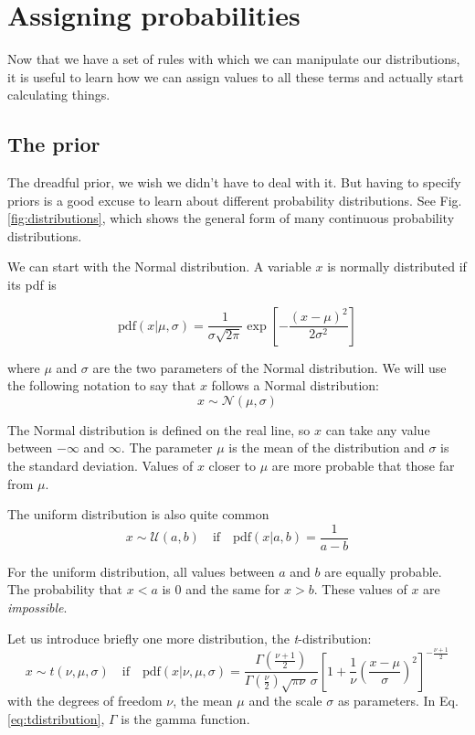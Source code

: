 \documentclass[a4paper,11pt]{article}
\begin{document}
\section{Assigning probabilities}

Now that we have a set of rules with which we can manipulate our distributions, it is useful to learn how we can assign values to all these terms and actually start calculating things.

\subsection{The prior}\label{sec:prior}

The dreadful prior, we wish we didn't have to deal with it. 
But having to specify priors is a good excuse to learn about different probability distributions. 
See Fig. \ref{fig:distributions}, which shows the general form of many continuous probability distributions.

We can start with the Normal distribution.
A variable $x$ is normally distributed if its pdf is

\begin{equation}
  \text{pdf}(x|\mu, \sigma) = \frac{1}{\sigma \sqrt{2\pi}} 
                              \exp\left[-\frac{(x-\mu)^2}{2\sigma^2}\right]
\end{equation}

where $\mu$ and $\sigma$ are the two parameters of the Normal distribution.
We will use the following notation to say that $x$ follows a Normal distribution:
%
\[x \sim \mathcal{N}(\mu, \sigma)\]
%

The Normal distribution is defined on the real line, so $x$ can take any value between $-\infty$ and $\infty$.
The parameter $\mu$ is the mean of the distribution and $\sigma$ is the standard deviation.
Values of $x$ closer to $\mu$ are more probable that those far from $\mu$.


The uniform distribution is also quite common
%
\[x \sim \mathcal{U}(a, b) \quad \text{if} \quad \text{pdf}(x|a,b) = \frac{1}{a-b} \]
%

For the uniform distribution, all values between $a$ and $b$ are equally probable.
The probability that $x<a$ is 0 and the same for $x>b$. These values of $x$ are \emph{impossible}.


Let us introduce briefly one more distribution, the \emph{t}-distribution:
%
\begin{equation}
  x \sim t(\nu,\mu,\sigma) \quad \text{if} \quad \text{pdf}(x|\nu, \mu, \sigma) = 
            \frac{\Gamma(\frac{\nu+1}{2})}{\Gamma(\frac{\nu}{2})\sqrt{\pi\nu}\,\sigma}
            \left[ 1 + \frac{1}{\nu} \left(\frac{x-\mu}{\sigma}\right)^2 \right]
                  ^{-\frac{\nu+1}{2}}
\label{eq:tdistribution}
\end{equation}
%
with the degrees of freedom $\nu$, the mean $\mu$ and the scale $\sigma$ as parameters.
In Eq. \eqref{eq:tdistribution}, $\Gamma$ is the gamma function.
\end{document}
